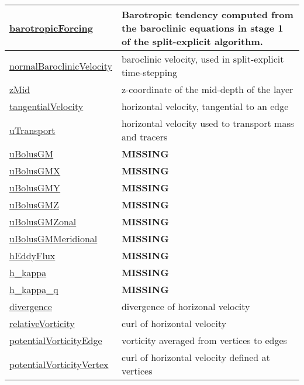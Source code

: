 {\begin{center}
\begin{longtable}{| p{2.0in} | p{4.0in} |}
	\hline
	\hyperref[subsec:var_sec_state_barotropicForcing]{barotropicForcing} & Barotropic tendency computed from the baroclinic equations in stage 1 of the split-explicit algorithm. \\
	\hline
	\hyperref[subsec:var_sec_state_normalBaroclinicVelocity]{normalBaroclinicVelocity} & baroclinic velocity, used in split-explicit time-stepping \\
	\hline
	\hyperref[subsec:var_sec_state_zMid]{zMid} & z-coordinate of the mid-depth of the layer \\
	\hline
	\hyperref[subsec:var_sec_state_tangentialVelocity]{tangentialVelocity} & horizontal velocity, tangential to an edge \\
	\hline
	\hyperref[subsec:var_sec_state_uTransport]{uTransport} & horizontal velocity used to transport mass and tracers \\
	\hline
	\hyperref[subsec:var_sec_state_uBolusGM]{uBolusGM} & {\bf \color{red} MISSING} \\
	\hline
	\hyperref[subsec:var_sec_state_uBolusGMX]{uBolusGMX} & {\bf \color{red} MISSING} \\
	\hline
	\hyperref[subsec:var_sec_state_uBolusGMY]{uBolusGMY} & {\bf \color{red} MISSING} \\
	\hline
	\hyperref[subsec:var_sec_state_uBolusGMZ]{uBolusGMZ} & {\bf \color{red} MISSING} \\
	\hline
	\hyperref[subsec:var_sec_state_uBolusGMZonal]{uBolusGMZonal} & {\bf \color{red} MISSING} \\
	\hline
	\hyperref[subsec:var_sec_state_uBolusGMMeridional]{uBolusGMMeridional} & {\bf \color{red} MISSING} \\
	\hline
	\hyperref[subsec:var_sec_state_hEddyFlux]{hEddyFlux} & {\bf \color{red} MISSING} \\
	\hline
	\hyperref[subsec:var_sec_state_h_kappa]{h\_kappa} & {\bf \color{red} MISSING} \\
	\hline
	\hyperref[subsec:var_sec_state_h_kappa_q]{h\_kappa\_q} & {\bf \color{red} MISSING} \\
	\hline
	\hyperref[subsec:var_sec_state_divergence]{divergence} & divergence of horizonal velocity \\
	\hline
	\hyperref[subsec:var_sec_state_relativeVorticity]{relativeVorticity} & curl of horizontal velocity \\
	\hline
	\hyperref[subsec:var_sec_state_potentialVorticityEdge]{potentialVorticityEdge} & vorticity averaged from vertices to edges \\
	\hline
	\hyperref[subsec:var_sec_state_potentialVorticityVertex]{potentialVorticityVertex} & curl of horizontal velocity defined at vertices \\

\end{longtable}
\end{center}}
